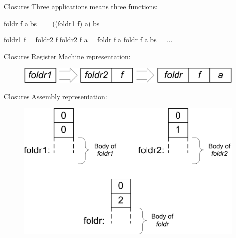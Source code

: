 \documentclass{beamer}
\begin{document}
\begin{frame}[fragile]{Closures}
  Three applications means three functions:
  \begin{code}
foldr f a bs == ((foldr1 f) a) bs
  \end{code}

  \begin{code}
foldr1 f = foldr2 f
foldr2 f a = foldr f a
foldr f a bs = ...
  \end{code}
\end{frame}

\begin{frame}{Closures}
  Register Machine representation:
\begin{figure}\centering
\includegraphics{fig_foldrReg}
\end{figure}

\end{frame}

\begin{frame}{Closures}
  Assembly representation:
\begin{figure}\centering
\includegraphics{fig_foldrAsm}
\end{figure}

\end{frame}

\end{document}
